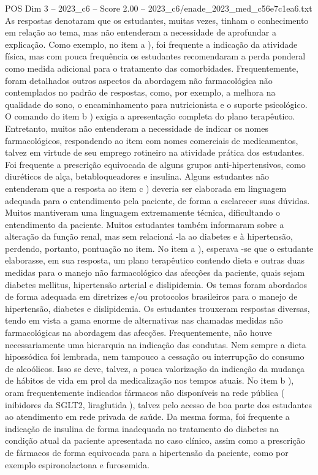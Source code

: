 \begin{textsample}{POS Dim 3 – 2023\_c6 – Score 2.00 – 2023\_c6/enade\_2023\_med\_c56e7c1ea6.txt}
As respostas denotaram que os estudantes, muitas vezes, tinham o conhecimento em relação ao tema, mas não entenderam a necessidade de aprofundar a explicação.
Como exemplo, no item a ), foi frequente a indicação da atividade física, mas com pouca frequência os estudantes recomendaram a perda ponderal como medida adicional para o tratamento das comorbidades.
Frequentemente, foram detalhados outros aspectos da abordagem não farmacológica não contemplados no padrão de respostas, como, por exemplo, a melhora na qualidade do sono, o encaminhamento para nutricionista e o suporte psicológico.
O comando do item b ) exigia a apresentação completa do plano terapêutico.
Entretanto, muitos não entenderam a necessidade de indicar os nomes farmacológicos, respondendo ao item com nomes comerciais de medicamentos, talvez em virtude de seu emprego rotineiro na atividade prática dos estudantes.
Foi frequente a prescrição equivocada de alguns grupos anti-hipertensivos, como diuréticos de alça, betabloqueadores e insulina.
Alguns estudantes não entenderam que a resposta ao item c ) deveria ser elaborada em linguagem adequada para o entendimento pela paciente, de forma a esclarecer suas dúvidas.
Muitos mantiveram uma linguagem extremamente técnica, dificultando o entendimento da paciente.
Muitos estudantes também informaram sobre a alteração da função renal, mas sem relacioná -la ao diabetes e à hipertensão, perdendo, portanto, pontuação no item.
No item a ), esperava -se que o estudante elaborasse, em sua resposta, um plano terapêutico contendo dieta e outras duas medidas para o manejo não farmacológico das afecções da paciente, quais sejam diabetes mellitus, hipertensão arterial e dislipidemia.
Os temas foram abordados de forma adequada em diretrizes e/ou protocolos brasileiros para o manejo de hipertensão, diabetes e dislipidemia.
Os estudantes trouxeram respostas diversas, tendo em vista a gama enorme de alternativas nas chamadas medidas não farmacológicas na abordagem das afecções.
Frequentemente, não houve necessariamente uma hierarquia na indicação das condutas.
Nem sempre a dieta hipossódica foi lembrada, nem tampouco a cessação ou interrupção do consumo de alcoólicos.
Isso se deve, talvez, a pouca valorização da indicação da mudança de hábitos de vida em prol da medicalização nos tempos atuais.
No item b ), oram frequentemente indicados fármacos não disponíveis na rede pública ( inibidores da SGLT2, liraglutida ), talvez pelo acesso de boa parte dos estudantes ao atendimento em rede privada de saúde.
Da mesma forma, foi frequente a indicação de insulina de forma inadequada no tratamento do diabetes na condição atual da paciente apresentada no caso clínico, assim como a prescrição de fármacos de forma equivocada para a hipertensão da paciente, como por exemplo espironolactona e furosemida.

\end{textsample}
